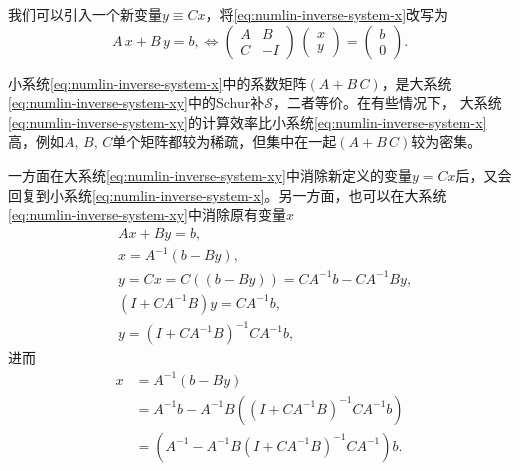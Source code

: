 我们可以引入一个新变量$y \equiv C x$，将\eqref{eq:numlin-inverse-system-x}改写为
\begin{equation}
  \label{eq:numlin-inverse-system-xy}
  A \, x + B \, y = b, \Longleftrightarrow
  \begin{pmatrix}
    A & B \\
    C & - I
  \end{pmatrix}
  \,
  \begin{pmatrix}
    x \\ y
  \end{pmatrix}
  =
  \begin{pmatrix}
    b \\ 0
  \end{pmatrix}.
\end{equation}

小系统\eqref{eq:numlin-inverse-system-x}中的系数矩阵$\left( A + B \, C \right)$，是大系统\eqref{eq:numlin-inverse-system-xy}中的Schur补$\mathcal{S}$，二者等价。在有些情况下，
大系统\eqref{eq:numlin-inverse-system-xy}的计算效率比小系统\eqref{eq:numlin-inverse-system-x}高，例如$A, \,B,\, C$单个矩阵都较为稀疏，但集中在一起$\left( A + B \, C \right)$较为密集。

一方面在大系统\eqref{eq:numlin-inverse-system-xy}中消除新定义的变量$y=C x$后，又会回复到小系统\eqref{eq:numlin-inverse-system-x}。另一方面，也可以在大系统\eqref{eq:numlin-inverse-system-xy}中消除原有变量$x$
\begin{equation*}
  \begin{split}
    & A x + B y = b, \\
    & x = A^{-1} \left( b - B y \right), \\
    & y = C x = C \left( \left( b - B y \right) \right) = C A^{-1} b - C A^{-1} B y, \\
    & \left( I + C A^{-1} B \right) y = C A^{-1} b, \\
    & y = \left( I + CA^{-1} B \right)^{-1} C A^{-1} b,
  \end{split}
\end{equation*}
进而
\begin{equation}
  \label{eq:numlin-inverse-system-y}
\begin{split}
  x & = A^{-1} \left( b - B y \right) \\
  & = A^{-1} b - A^{-1} B
  \left(
  \left( I + C A^{-1} B \right)^{-1} C A^{-1} b
  \right) \\
  & = \left(
  A^{-1} - A^{-1} B
  \left( I + C A^{-1} B \right)^{-1}
  C A^{-1}
  \right)
  b.
\end{split}
\end{equation}

